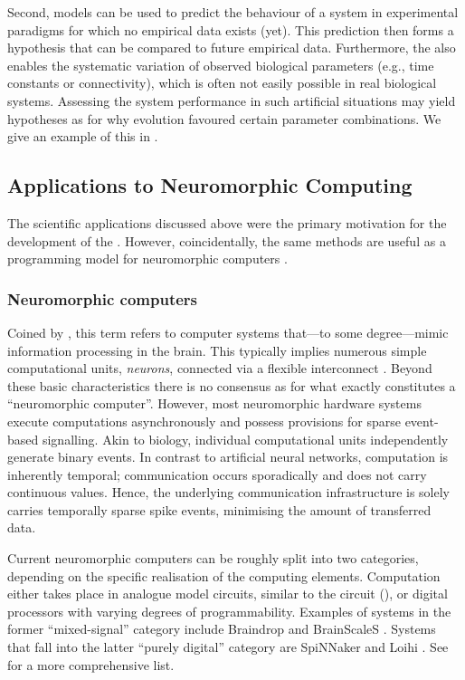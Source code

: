 Second, \NEF models can be used to predict the behaviour of a system in experimental paradigms for which no empirical data exists (yet).
This prediction then forms a hypothesis that can be compared to future empirical data.
Furthermore, the \NEF also enables the systematic variation of observed biological parameters (e.g., time constants or connectivity), which is often not easily possible in real biological systems.
Assessing the system performance in such artificial situations may yield hypotheses as for why evolution favoured certain parameter combinations.
We give an example of this in .

\subsection{Applications to Neuromorphic Computing}
\label{sec:neuromorphic}

The scientific applications discussed above were the primary motivation for the development of the \NEF.
However, coincidentally, the same methods are useful as a programming model for neuromorphic computers \citep{boahen2017neuromorph,voelker2021programming}.

\subsubsection{Neuromorphic computers}
Coined by \citet{mead1990neuromorphic}, this term refers to computer systems that---to some degree---mimic information processing in the brain.
This typically implies numerous simple computational units, \emph{neurons}, connected via a flexible interconnect \citep{furber2016largescale}.
Beyond these basic characteristics there is no consensus as for what exactly constitutes a \enquote{neuromorphic computer}.
However, most neuromorphic hardware systems execute computations asynchronously and possess provisions for sparse event-based signalling.
Akin to biology, individual computational units independently generate binary events.
In contrast to artificial neural networks, computation is inherently temporal; communication occurs sporadically and does not carry continuous values.
Hence, the underlying communication infrastructure is solely carries temporally sparse spike events, minimising the amount of transferred data.

Current neuromorphic computers can be roughly split into two categories, depending on the specific realisation of the computing elements.
Computation either takes place in analogue model circuits, similar to the \LIF circuit (), or digital processors with varying degrees of programmability.
Examples of systems in the former \enquote{mixed-signal} category include Braindrop \citep{neckar2019braindrop} and BrainScaleS \citep{schemmel2010waferscale}.
Systems that fall into the latter \enquote{purely digital} category are SpiNNaker \citep{furber2013overview} and Loihi \citep{davies2018loihi}. See \citet{furber2016largescale} for a more comprehensive list.

